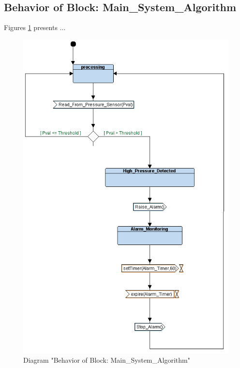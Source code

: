 \subsection{Behavior of Block: Main\_System\_Algorithm}
Figures \ref{fig:MainSystemAlgorithmMainSystemAlgorithm23} presents ...
\begin{figure}[htb]
\centering
\includegraphics[width=\textwidth]{img_2_3.png}
\caption{Diagram "Behavior of Block: Main\_System\_Algorithm"}
\label{fig:MainSystemAlgorithmMainSystemAlgorithm23}
\end{figure}

